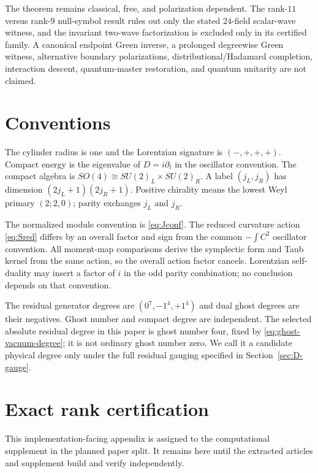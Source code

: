 \documentclass[11pt]{article}
\theoremstyle{definition}
\theoremstyle{remark}
\begin{document}
The theorem remains classical, free, and polarization dependent.  The
rank-$11$ versus rank-$9$ null-symbol result rules out only the stated
$24$-field scalar-wave witness, and the invariant two-wave factorization is
excluded only in its certified family.  A canonical endpoint Green inverse,
a prolonged degreewise Green witness, alternative boundary polarizations,
distributional/Hadamard completion, interaction descent, quantum-master
restoration, and quantum unitarity are not claimed.

\appendix

\section{Conventions}\label{app:conventions}

The cylinder radius is one and the Lorentzian signature is $(-,+,+,+)$.
Compact energy is the eigenvalue of $D=i\partial_t$ in the oscillator
convention.  The compact algebra is
$SO(4)\cong SU(2)_L\times SU(2)_R$.  A label $(j_L,j_R)$ has dimension
$(2j_L+1)(2j_R+1)$.  Positive chirality means the lowest Weyl primary
$(2;2,0)$; parity exchanges $j_L$ and $j_R$.

The normalized module convention is \eqref{eq:Jconf}.  The reduced curvature
action \eqref{eq:Sred} differs by an overall factor and sign from the common
$-\int C^2$ oscillator convention.  All moment-map comparisons derive the
symplectic form and Taub kernel from the same action, so the overall action
factor cancels.  Lorentzian self-duality may insert a factor of $i$ in the
odd parity combination; no conclusion depends on that convention.

The residual generator degrees are $(0^7,-1^4,+1^4)$ and dual ghost degrees
are their negatives.  Ghost number and compact degree are independent.
The selected absolute residual degree in this paper is ghost number four,
fixed by \eqref{eq:ghost-vacuum-degree}; it is not ordinary ghost number
zero.  We call it a candidate physical degree only under the full residual
gauging specified in Section~\ref{sec:D-gauge}.

\section{Exact rank certification}\label{app:ranks}

This implementation-facing appendix is assigned to the computational
supplement in the planned paper split.  It remains here until the extracted
articles and supplement build and verify independently.
\end{document}
